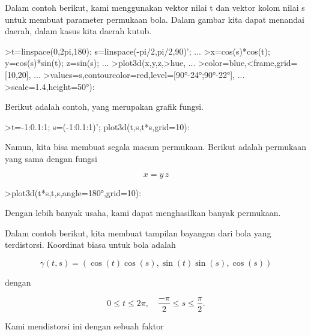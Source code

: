 \documentclass[a4paper,10pt]{article}
\begin{document}
\begin{eulernotebook}
\begin{eulercomment}
\begin{eulercomment}
\begin{eulercomment}
\begin{eulercomment}
\begin{eulercomment}
\begin{eulercomment}
\begin{eulercomment}
\begin{eulercomment}
\begin{eulercomment}
\begin{eulercomment}
\begin{eulercomment}
Dalam contoh berikut, kami menggunakan vektor nilai t dan vektor kolom
nilai s untuk membuat parameter permukaan bola. Dalam gambar kita
dapat menandai daerah, dalam kasus kita daerah kutub.
\end{eulercomment}
\begin{eulerprompt}
>t=linspace(0,2pi,180); s=linspace(-pi/2,pi/2,90)'; ...
>x=cos(s)*cos(t); y=cos(s)*sin(t); z=sin(s); ...
>plot3d(x,y,z,>hue, ...
>color=blue,<frame,grid=[10,20], ...
>values=s,contourcolor=red,level=[90°-24°;90°-22°], ...
>scale=1.4,height=50°):
\end{eulerprompt}
\begin{eulercomment}
Berikut adalah contoh, yang merupakan grafik fungsi.
\end{eulercomment}
\begin{eulerprompt}
>t=-1:0.1:1; s=(-1:0.1:1)'; plot3d(t,s,t*s,grid=10):
\end{eulerprompt}
\begin{eulercomment}
Namun, kita bisa membuat segala macam permukaan. Berikut adalah
permukaan yang sama dengan fungsi

\end{eulercomment}
\begin{eulerformula}
\[
x = y \, z
\]
\end{eulerformula}
\begin{eulerprompt}
>plot3d(t*s,t,s,angle=180°,grid=10):
\end{eulerprompt}
\begin{eulercomment}
Dengan lebih banyak usaha, kami dapat menghasilkan banyak permukaan.

Dalam contoh berikut, kita membuat tampilan bayangan dari bola yang
terdistorsi. Koordinat biasa untuk bola adalah

\end{eulercomment}
\begin{eulerformula}
\[
\gamma(t,s) = (\cos(t)\cos(s),\sin(t)\sin(s),\cos(s))
\]
\end{eulerformula}
\begin{eulercomment}
dengan

\end{eulercomment}
\begin{eulerformula}
\[
0 \le t \le 2\pi, \quad \frac{-\pi}{2} \le s \le \frac{\pi}{2}.
\]
\end{eulerformula}
\begin{eulercomment}
Kami mendistorsi ini dengan sebuah faktor


\end{eulercomment}
\end{eulercomment}
\end{eulercomment}
\end{eulercomment}
\end{eulercomment}
\end{eulercomment}
\end{eulercomment}
\end{eulercomment}
\end{eulercomment}
\end{eulercomment}
\end{eulercomment}
\end{eulernotebook}
\end{document}
